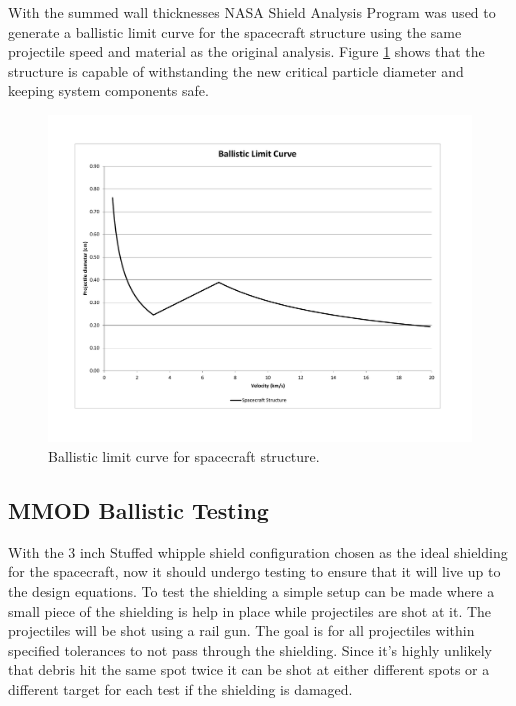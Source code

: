 \documentclass[paper=letter, fontsize=11pt]{scrartcl} %
\numberwithin{equation}{section} %
\numberwithin{figure}{section} %
\numberwithin{table}{section} %
\begin{document}
With the summed wall thicknesses NASA Shield Analysis Program was used to generate a ballistic limit curve for the spacecraft structure using the same projectile speed and material as the original analysis. Figure \ref{fig:MMODstructure} shows that the structure is capable of withstanding the new critical particle diameter and keeping system components safe.

\begin{figure}[H]
	\begin{center}
	\includegraphics[width=5in]{MMODstructure.pdf}
	\caption{Ballistic limit curve for spacecraft structure.}
	\label{fig:MMODstructure}
	\end{center}
\end{figure}

\subsection{MMOD Ballistic Testing}
With the 3 inch Stuffed whipple shield configuration chosen as the ideal shielding for the spacecraft, now it should undergo testing to ensure that it will live up to the design equations. To test the shielding a simple setup can be made where a small piece of the shielding is help in place while projectiles are shot at it. The projectiles will be shot using a rail gun. The goal is for all projectiles within specified tolerances to not pass through the shielding. Since it's highly unlikely that debris hit the same spot twice it can be shot at either different spots or a different target for each test if the shielding is damaged.

\end{document}
